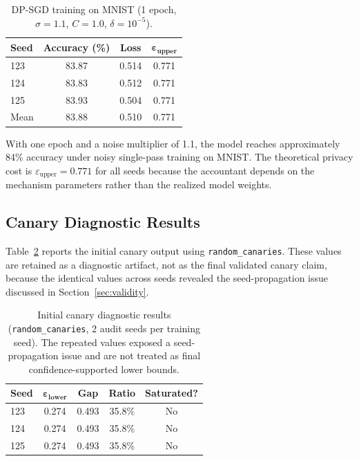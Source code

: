 \documentclass{article}
\begin{document}
\begin{table}[h]
\caption{DP-SGD training on MNIST (1 epoch, $\sigma = 1.1$, $C = 1.0$, $\delta = 10^{-5}$).}
\label{tab:training}
\centering
\begin{tabular}{@{}lccc@{}}
\toprule
\textbf{Seed} & \textbf{Accuracy (\%)} & \textbf{Loss} & $\boldsymbol{\varepsilon_{\text{upper}}}$ \\
\midrule
123 & 83.87 & 0.514 & 0.771 \\
124 & 83.83 & 0.512 & 0.771 \\
125 & 83.93 & 0.504 & 0.771 \\
\midrule
Mean & 83.88 & 0.510 & 0.771 \\
\bottomrule
\end{tabular}
\end{table}

With one epoch and a noise multiplier of 1.1, the model reaches approximately 84\% accuracy under noisy single-pass training on MNIST. The theoretical privacy cost is $\varepsilon_{\text{upper}} = 0.771$ for all seeds because the accountant depends on the mechanism parameters rather than the realized model weights.

\subsection{Canary Diagnostic Results}

Table~\ref{tab:canary} reports the initial canary output using \texttt{random\_canaries}. These values are retained as a diagnostic artifact, not as the final validated canary claim, because the identical values across seeds revealed the seed-propagation issue discussed in Section~\ref{sec:validity}.

\begin{table}[h]
\caption{Initial canary diagnostic results (\texttt{random\_canaries}, 2 audit seeds per training seed). The repeated values exposed a seed-propagation issue and are not treated as final confidence-supported lower bounds.}
\label{tab:canary}
\centering
\begin{tabular}{@{}lcccc@{}}
\toprule
\textbf{Seed} & $\boldsymbol{\varepsilon_{\text{lower}}}$ & \textbf{Gap} & \textbf{Ratio} & \textbf{Saturated?} \\
\midrule
123 & 0.274 & 0.493 & 35.8\% & No \\
124 & 0.274 & 0.493 & 35.8\% & No \\
125 & 0.274 & 0.493 & 35.8\% & No \\
\bottomrule
\end{tabular}
\end{table}
\end{document}
